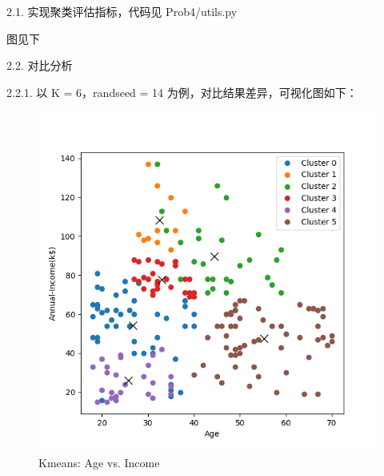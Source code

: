 \documentclass[8pt]{article}
\begin{document}
2.1. 实现聚类评估指标，代码见 {\color{blue}Prob4/utils.py}

图见下

2.2. 对比分析

2.2.1. 以 K = 6，randseed = 14 为例，对比结果差异，可视化图如下：

\begin{figure}[H]
    \centering
    \begin{minipage}{0.32\textwidth}
        \centering
        \includegraphics[width=\textwidth]{./Prob4/out/task1_rand14/images/cluster_result_k6_0_1.png}
        \caption{Kmeans: Age vs. Income}
        \label{fig: Age vs. Annual Income k6 com}
    \end{minipage}
    \hfill
    \begin{minipage}{0.32\textwidth}
        \centering

\end{minipage}
\end{figure}
\end{document}
